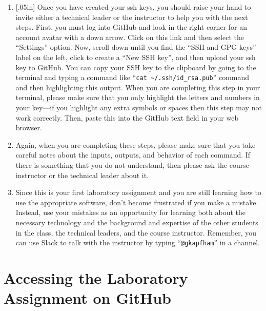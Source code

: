 \documentclass[11pt]{article}
\newcommand{\command}[1]{``\lstinline{#1}''}
\newcommand{\caution}[1]{\null\hfill\LARGE{\faWarning{}}\newline\scriptsize{\em{#1}}}
\begin{document}
\begin{enumerate}
  \item \marginnote{\caution{Upload keys correctly}}[.05in] Once you have
    created your ssh keys, you should raise your hand to invite either a
    technical leader or the instructor to help you with the next steps. First,
    you must log into GitHub and look in the right corner for an account avatar
    with a down arrow. Click on this link and then select the ``Settings''
    option. Now, scroll down until you find the ``SSH and GPG keys'' label on
    the left, click to create a ``New SSH key'', and then upload your ssh key
    to GitHub. You can copy your SSH key to the clipboard by going to the
    terminal and typing a command like ``{\tt cat
    \textasciitilde{}/.ssh/id\_rsa.pub}'' command and then highlighting this
    output. When you are completing this step in your terminal, please make
    sure that you only highlight the letters and numbers in your key---if you
    highlight any extra symbols or spaces then this step may not work
    correctly. Then, paste this into the GitHub text field in your web browser.

  \item Again, when you are completing these steps, please make sure that you
    take careful notes about the inputs, outputs, and behavior of each command.
    If there is something that you do not understand, then please ask the course
    instructor or the technical leader about it.

  \item Since this is your first laboratory assignment and you are still
    learning how to use the appropriate software, don't become frustrated if you
    make a mistake. Instead, use your mistakes as an opportunity for learning
    both about the necessary technology and the background and expertise of the
    other students in the class, the technical leaders, and the course
    instructor. Remember, you can use Slack to talk with the instructor by
    typing \command{@gkapfham} in a channel.

\end{enumerate}

\section*{Accessing the Laboratory Assignment on GitHub}
\end{document}
